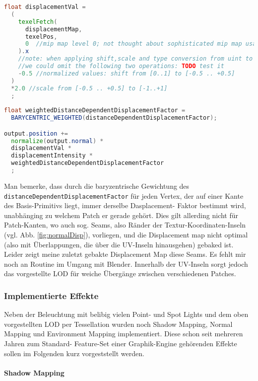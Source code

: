 	\begin{lstlisting}[language=GLSL]  
float displacementVal = 
  (
    texelFetch(
      displacementMap, 
      texelPos,
      0  //mip map level 0; not thought about sophisticated mip map usage in this context yet
    ).x 
    //note: when applying shift,scale and type conversion from uint to int and setting the texture parameters accordingly,
    //we could omit the following two operations: TODO test it
    -0.5 //normalized values: shift from [0..1] to [-0.5 .. +0.5]
  )
  *2.0 //scale from [-0.5 .. +0.5] to [-1..+1]
  ;
        
float weightedDistanceDependentDisplacementFactor = 
  BARYCENTRIC_WEIGHTED(distanceDependentDisplacementFactor);         

output.position +=  
  normalize(output.normal) * 
  displacementVal *
  displacementIntensity * 
  weightedDistanceDependentDisplacementFactor
  ;
	\end{lstlisting}
	Man bemerke, dass durch die baryzentrische Gewichtung des \lstinline|distanceDependentDisplacementFactor|
	für jeden Vertex, der auf einer Kante des Basis-Primitivs liegt, immer derselbe Dasplacement- Faktor bestimmt wird, 
	unabhänging zu welchem Patch er gerade gehört. Dies gilt allerding nicht für Patch-Kanten, wo auch
	sog. Seams, also Ränder der Textur-Koordinaten-Inseln (vgl. Abb. \ref{fig:normalDisp}), vorliegen, und die Displacement
	map nicht optimal (also mit Überlappungen, die über die UV-Inseln hinausgehen) gebaked ist.
	Leider zeigt meine zuletzt gebakte Displacement Map diese Seams. Es fehlt mir noch an Routine im Umgang mit Blender.
	Innerhalb der UV-Inseln sorgt jedoch das vorgestellte LOD für weiche Übergänge zwischen verschiedenen Patches.

	
\subsubsection{Implementierte Effekte}
	\label{sec:genericVisualEffects}
	Neben der Beleuchtung mit belibig vielen Point- und Spot Lights und dem oben vorgestellten LOD per Tessellation
	wurden noch Shadow Mapping, Normal Mapping und Environment Mapping implementiert. 
	Diese schon seit mehreren Jahren zum Standard- Feature-Set einer Graphik-Engine gehörenden Effekte
	sollen im Folgenden kurz vorgeststellt werden.
	

	\paragraph{Shadow Mapping}
	
